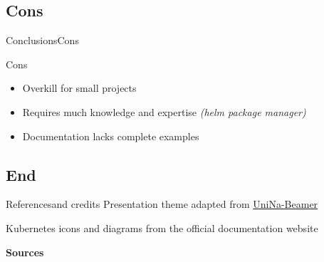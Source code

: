 \documentclass[10pt,aspectratio=169
	]{beamer}
\begin{document}
		\subsection{Cons}
		\begin{frame}{Conclusions}{Cons}
			\begin{alertblock}{Cons}
				\begin{itemize}
					\item Overkill for small projects
					\item Requires much knowledge and expertise \textit{(helm package manager)}
					\item Documentation lacks complete examples
				\end{itemize}
			\end{alertblock}
		\end{frame}

		\subsection{End}
		\begin{frame}
		\end{frame}

	\begin{frame}{References}{and credits}
		Presentation theme adapted from \href{https://github.com/luistar/unina-beamer}{UniNa-Beamer}

		Kubernetes icons and diagrams from the official documentation website

		\vspace{1em}
		\textbf{Sources}
		\printbibliography[heading=none]
	\end{frame}

	\begin{frame}
		\standoutpage{}
	\end{frame}
\end{document}
